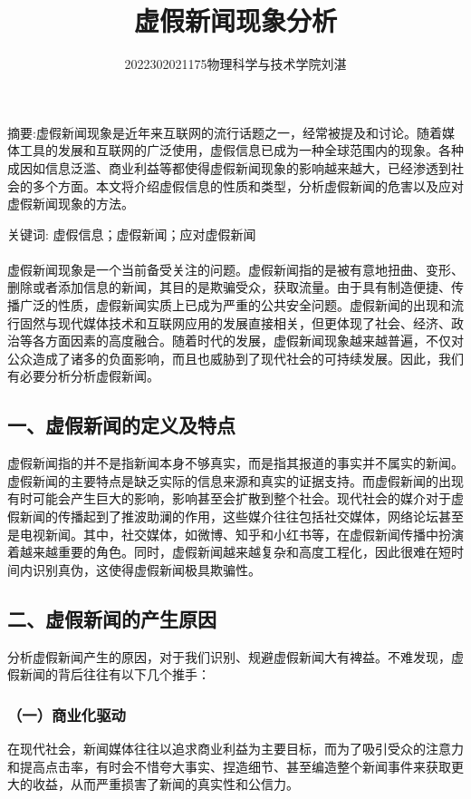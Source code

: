 ﻿\documentclass{ctexart}
\title{\heiti \textbf{\zihao{4}虚假新闻现象分析}}
\author{\heiti \zihao{-4}2022302021175\quad \heiti \zihao{-4}物理科学与技术学院\quad \heiti \zihao{-4}刘湛}
\date{}
\begin{document}
\maketitle
\par
\section*{}
\noindent
{\heiti {}摘要:}虚假新闻现象是近年来互联网的流行话题之一，经常被提及和讨论。随着媒体工具的发展和互联网的广泛使用，虚假信息已成为一种全球范围内的现象。各种成因如信息泛滥、商业利益等都使得虚假新闻现象的影响越来越大，已经渗透到社会的多个方面。本文将介绍虚假信息的性质和类型，分析虚假新闻的危害以及应对虚假新闻现象的方法。

\noindent
{\heiti {}关键词:} 虚假信息；虚假新闻；应对虚假新闻
\\ \hspace*{\fill} \\
\indent
虚假新闻现象是一个当前备受关注的问题。虚假新闻指的是被有意地扭曲、变形、删除或者添加信息的新闻，其目的是欺骗受众，获取流量。由于具有制造便捷、传播广泛的性质，虚假新闻实质上已成为严重的公共安全问题。虚假新闻的出现和流行固然与现代媒体技术和互联网应用的发展直接相关，但更体现了社会、经济、政治等各方面因素的高度融合。随着时代的发展，虚假新闻现象越来越普遍，不仅对公众造成了诸多的负面影响，而且也威胁到了现代社会的可持续发展。因此，我们有必要分析分析虚假新闻。
\subsection*{\textbf{一、虚假新闻的定义及特点}}
虚假新闻指的并不是指新闻本身不够真实，而是指其报道的事实并不属实的新闻。虚假新闻的主要特点是缺乏实际的信息来源和真实的证据支持。而虚假新闻的出现有时可能会产生巨大的影响，影响甚至会扩散到整个社会。现代社会的媒介对于虚假新闻的传播起到了推波助澜的作用，这些媒介往往包括社交媒体，网络论坛甚至是电视新闻。其中，社交媒体，如微博、知乎和小红书等，在虚假新闻传播中扮演着越来越重要的角色。同时，虚假新闻越来越复杂和高度工程化，因此很难在短时间内识别真伪，这使得虚假新闻极具欺骗性。
\subsection*{\textbf{二、虚假新闻的产生原因}}
分析虚假新闻产生的原因，对于我们识别、规避虚假新闻大有裨益。不难发现，虚假新闻的背后往往有以下几个推手：
\subsubsection*{\quad \quad（一）商业化驱动}
在现代社会，新闻媒体往往以追求商业利益为主要目标，而为了吸引受众的注意力和提高点击率，有时会不惜夸大事实、捏造细节、甚至编造整个新闻事件来获取更大的收益，从而严重损害了新闻的真实性和公信力。
\end{document}
